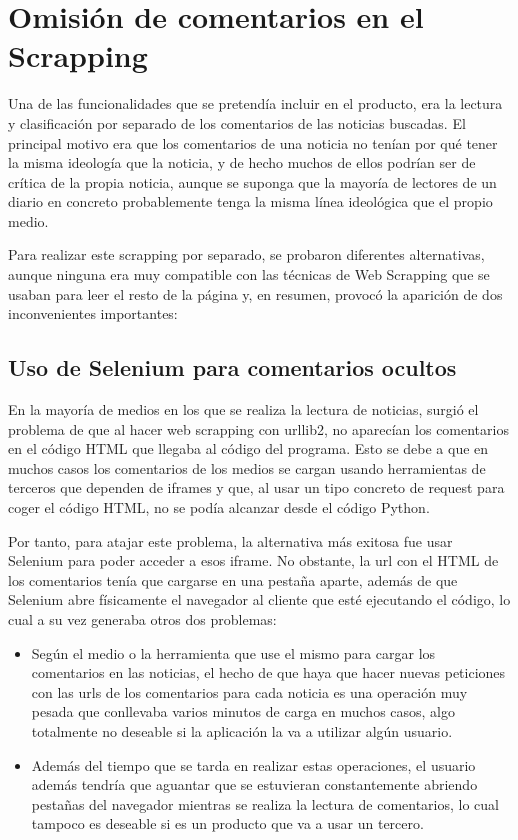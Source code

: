 \section{Omisión de comentarios en el Scrapping}

Una de las funcionalidades que se pretendía incluir en el producto, era la lectura y clasificación por separado de los comentarios de las noticias buscadas. El principal motivo era que los comentarios de una noticia no tenían por qué tener la misma ideología que la noticia, y de hecho muchos de ellos podrían ser de crítica de la propia noticia, aunque se suponga que la mayoría de lectores de un diario en concreto probablemente tenga la misma línea ideológica que el propio medio.


Para realizar este scrapping por separado, se probaron diferentes alternativas, aunque ninguna era muy compatible con las técnicas de Web Scrapping que se usaban para leer el resto de la página y, en resumen, provocó la aparición de dos inconvenientes importantes:

\subsection{Uso de Selenium para comentarios ocultos}

En la mayoría de medios en los que se realiza la lectura de noticias, surgió el problema de que al hacer web scrapping con urllib2, no aparecían los comentarios en el código HTML que llegaba al código del programa. Esto se debe a que en muchos casos los comentarios de los medios se cargan usando herramientas de terceros que dependen de iframes y que, al usar un tipo concreto de request para coger el código HTML, no se podía alcanzar desde el código Python. 

Por tanto, para atajar este problema, la alternativa más exitosa fue usar Selenium para poder acceder a esos iframe. No obstante, la url con el HTML de los comentarios tenía que cargarse en una pestaña aparte, además de que Selenium abre físicamente el navegador al cliente que esté ejecutando el código, lo cual a su vez generaba otros dos problemas:

\begin{itemize}

\item Según el medio o la herramienta que use el mismo para cargar los comentarios en las noticias, el hecho de que haya que hacer nuevas peticiones con las urls de los comentarios para cada noticia es una operación muy pesada que conllevaba varios minutos de carga en muchos casos, algo totalmente no deseable si la aplicación la va a utilizar algún usuario.

\item Además del tiempo que se tarda en realizar estas operaciones, el usuario además tendría que aguantar que se estuvieran constantemente abriendo pestañas del navegador mientras se realiza la lectura de comentarios, lo cual tampoco es deseable si es un producto que va a usar un tercero.

\end{itemize}
 



